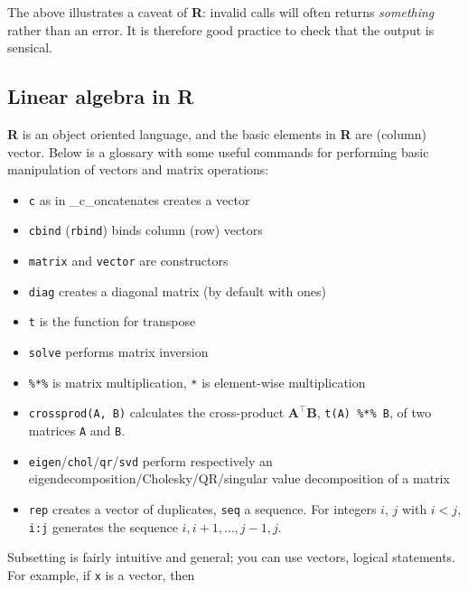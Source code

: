 \documentclass[]{book}
\providecommand{\tightlist}{%
  \setlength{\itemsep}{0pt}\setlength{\parskip}{0pt}}
\theoremstyle{definition}
\theoremstyle{definition}
\theoremstyle{definition}
\theoremstyle{remark}
\begin{document}
The above illustrates a caveat of \textbf{R}: invalid calls will often
returns \emph{something} rather than an error. It is therefore good
practice to check that the output is sensical.

\subsection{\texorpdfstring{Linear algebra in
\textbf{R}}{Linear algebra in R}}\label{linear-algebra-in-r}

\textbf{R} is an object oriented language, and the basic elements in
\textbf{R} are (column) vector. Below is a glossary with some useful
commands for performing basic manipulation of vectors and matrix
operations:

\begin{itemize}
\tightlist
\item
  \texttt{c} as in \_c\_oncatenates creates a vector
\item
  \texttt{cbind} (\texttt{rbind}) binds column (row) vectors
\item
  \texttt{matrix} and \texttt{vector} are constructors
\item
  \texttt{diag} creates a diagonal matrix (by default with ones)
\item
  \texttt{t} is the function for transpose
\item
  \texttt{solve} performs matrix inversion
\item
  \texttt{\%*\%} is matrix multiplication, \texttt{*} is element-wise
  multiplication
\item
  \texttt{crossprod(A,\ B)} calculates the cross-product
  \(\mathbf{A}^\top\mathbf{B}\), \texttt{t(A)\ \%*\%\ B}, of two
  matrices \texttt{A} and \texttt{B}.
\item
  \texttt{eigen}/\texttt{chol}/\texttt{qr}/\texttt{svd} perform
  respectively an eigendecomposition/Cholesky/QR/singular value
  decomposition of a matrix
\item
  \texttt{rep} creates a vector of duplicates, \texttt{seq} a sequence.
  For integers \(i\), \(j\) with \(i<j\), \texttt{i:j} generates the
  sequence \(i, i+1, \ldots, j-1, j\).
\end{itemize}

Subsetting is fairly intuitive and general; you can use vectors, logical
statements. For example, if \texttt{x} is a vector, then
\end{document}

